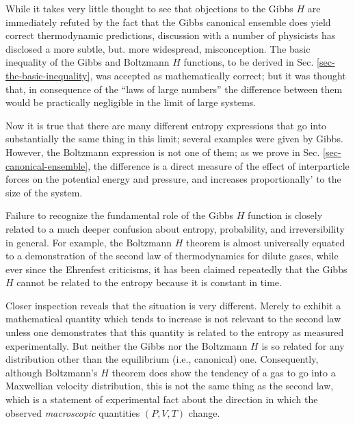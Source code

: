 \documentclass[twocolumn]{article}
\begin{document}
While it takes very little thought to see that objections to the Gibbs
$H$ are immediately refuted by the fact that the Gibbs canonical
ensemble does yield correct thermodynamic predictions, discussion with a
number of physicists has disclosed a more subtle, but. more widespread,
misconception. The basic inequality of the Gibbs and Boltzmann $H$
functions, to be derived in Sec. \ref{sec-the-basic-inequality}, was accepted as mathematically
correct; but it was thought that, in consequence of the ``laws of large
numbers'' the difference between them would be practically negligible in
the limit of large systems.

Now it is true that there are many different entropy expressions that go
into substantially the same thing in this limit; several examples were
given by Gibbs. However, the Boltzmann expression is not one of them; as
we prove in Sec. \ref{sec-canonical-ensemble}, the difference is a direct measure of the effect
of interparticle forces on the potential energy and pressure, and
increases proportionally' to the size of the system.

Failure to recognize the fundamental role of the Gibbs $H$ function
is closely related to a much deeper confusion about entropy,
probability, and irreversibility in general. For example, the Boltzmann
$H$ theorem is almost universally equated to a demonstration of the
second law of thermodynamics for dilute gases, while ever since the
Ehrenfest criticisms, it has been claimed repeatedly that the Gibbs
$H$ cannot be related to the entropy because it is constant in
time.

Closer inspection reveals that the situation is very different. Merely
to exhibit a mathematical quantity which tends to increase is not
relevant to the second law unless one demonstrates that this quantity is
related to the entropy as measured experimentally. But neither the Gibbs
nor the Boltzmann $H$ is so related for any distribution other than
the equilibrium (i.e., canonical) one. Consequently, although
Boltzmann's $H$ theorem does show the tendency of a gas to go into
a Maxwellian velocity distribution, this is not the same thing as the
second law, which is a statement of experimental fact about the
direction in which the observed \emph{macroscopic} quantities
\((P,V,T)\) change.
\end{document}
